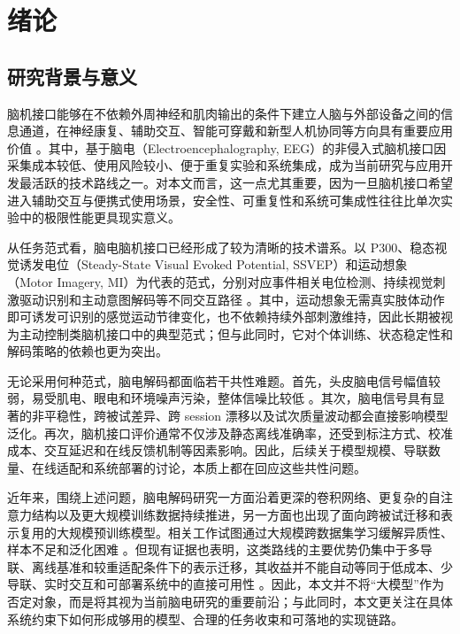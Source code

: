 \chapter{绪论}
\label{cha:intro}

\section{研究背景与意义}

脑机接口能够在不依赖外周神经和肌肉输出的条件下建立人脑与外部设备之间的信息通道，在神经康复、辅助交互、智能可穿戴和新型人机协同等方向具有重要应用价值 \cite{chaudhary2016brain, lotte2018review}。其中，基于脑电（Electroencephalography, EEG）的非侵入式脑机接口因采集成本较低、使用风险较小、便于重复实验和系统集成，成为当前研究与应用开发最活跃的技术路线之一。对本文而言，这一点尤其重要，因为一旦脑机接口希望进入辅助交互与便携式使用场景，安全性、可重复性和系统可集成性往往比单次实验中的极限性能更具现实意义。

从任务范式看，脑电脑机接口已经形成了较为清晰的技术谱系。以 P300、稳态视觉诱发电位（Steady-State Visual Evoked Potential, SSVEP）和运动想象（Motor Imagery, MI）为代表的范式，分别对应事件相关电位检测、持续视觉刺激驱动识别和主动意图解码等不同交互路径 \cite{farwell1988talking, bin2011high, pfurtscheller1999event}。其中，运动想象无需真实肢体动作即可诱发可识别的感觉运动节律变化，也不依赖持续外部刺激维持，因此长期被视为主动控制类脑机接口中的典型范式；但与此同时，它对个体训练、状态稳定性和解码策略的依赖也更为突出。

无论采用何种范式，脑电解码都面临若干共性难题。首先，头皮脑电信号幅值较弱，易受肌电、眼电和环境噪声污染，整体信噪比较低 \cite{goncharova2003emg, lotte2018review}。其次，脑电信号具有显著的非平稳性，跨被试差异、跨 session 漂移以及试次质量波动都会直接影响模型泛化。再次，脑机接口评价通常不仅涉及静态离线准确率，还受到标注方式、校准成本、交互延迟和在线反馈机制等因素影响。因此，后续关于模型规模、导联数量、在线适配和系统部署的讨论，本质上都在回应这些共性问题。

近年来，围绕上述问题，脑电解码研究一方面沿着更深的卷积网络、更复杂的自注意力结构以及更大规模训练数据持续推进，另一方面也出现了面向跨被试迁移和表示复用的大规模预训练模型。相关工作试图通过大规模跨数据集学习缓解异质性、样本不足和泛化困难 \cite{Jia24, Wan24b}。但现有证据也表明，这类路线的主要优势仍集中于多导联、离线基准和较重适配条件下的表示迁移，其收益并不能自动等同于低成本、少导联、实时交互和可部署系统中的直接可用性 \cite{Liu26b}。因此，本文并不将“大模型”作为否定对象，而是将其视为当前脑电研究的重要前沿；与此同时，本文更关注在具体系统约束下如何形成够用的模型、合理的任务收束和可落地的实现链路。

